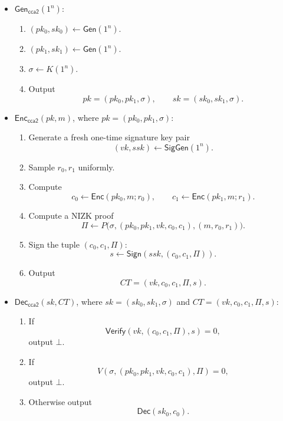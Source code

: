 \begin{itemize}
    \item $\mathsf{Gen}_{\mathsf{cca2}}(1^n)$:
    \begin{enumerate}
        \item $(pk_0,sk_0)\gets \mathsf{Gen}(1^n)$.
        \item $(pk_1,sk_1)\gets \mathsf{Gen}(1^n)$.
        \item $\sigma\gets K(1^n)$.
        \item Output
        \[
        pk=(pk_0,pk_1,\sigma),
        \qquad
        sk=(sk_0,sk_1,\sigma).
        \]
    \end{enumerate}

    \item $\mathsf{Enc}_{\mathsf{cca2}}(pk,m)$, where $pk=(pk_0,pk_1,\sigma)$:
    \begin{enumerate}
        \item Generate a fresh one-time signature key pair
        \[
        (vk,ssk)\gets \mathsf{SigGen}(1^n).
        \]
        \item Sample $r_0,r_1$ uniformly.
        \item Compute
        \[
        c_0\gets \mathsf{Enc}(pk_0,m;r_0),
        \qquad
        c_1\gets \mathsf{Enc}(pk_1,m;r_1).
        \]
        \item Compute a NIZK proof
        \[
        \Pi\gets P\bigl(\sigma,
        (pk_0,pk_1,vk,c_0,c_1),
        (m,r_0,r_1)
        \bigr).
        \]
        \item Sign the tuple $(c_0,c_1,\Pi)$:
        \[
        s\gets \mathsf{Sign}(ssk,(c_0,c_1,\Pi)).
        \]
        \item Output
        \[
        CT=(vk,c_0,c_1,\Pi,s).
        \]
    \end{enumerate}

    \item $\mathsf{Dec}_{\mathsf{cca2}}(sk,CT)$, where
    $sk=(sk_0,sk_1,\sigma)$ and $CT=(vk,c_0,c_1,\Pi,s)$:
    \begin{enumerate}
        \item If
        \[
        \mathsf{Verify}(vk,(c_0,c_1,\Pi),s)=0,
        \]
        output $\bot$.
        \item If
        \[
        V(\sigma,(pk_0,pk_1,vk,c_0,c_1),\Pi)=0,
        \]
        output $\bot$.
        \item Otherwise output
        \[
        \mathsf{Dec}(sk_0,c_0).
        \]
    \end{enumerate}
\end{itemize}

